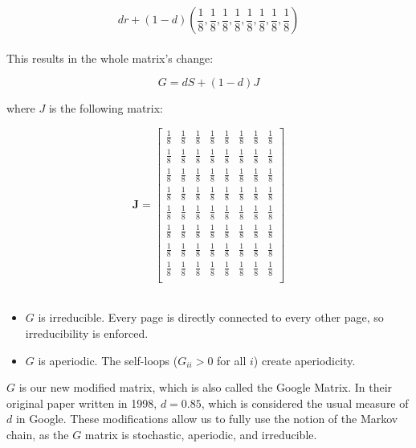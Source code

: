 \documentclass{article}
\begin{document}
\[ dr+(1-d)\left(\frac{1}{8}, \frac{1}{8}, \frac{1}{8}, \frac{1}{8}, \frac{1}{8}, \frac{1}{8}, \frac{1}{8}, \frac{1}{8}\right) \]
\\


This results in the whole matrix's change:

\[ G=dS + (1-d)J\]

where \( J \) is the following matrix:

\[ \mathbf{J} = \begin{bmatrix}
\frac{1}{8} & \frac{1}{8} & \frac{1}{8} & \frac{1}{8} & \frac{1}{8} & \frac{1}{8} & \frac{1}{8} & \frac{1}{8} \\
\frac{1}{8} & \frac{1}{8} & \frac{1}{8} & \frac{1}{8} & \frac{1}{8} & \frac{1}{8} & \frac{1}{8} & \frac{1}{8} \\
\frac{1}{8} & \frac{1}{8} & \frac{1}{8} & \frac{1}{8} & \frac{1}{8} & \frac{1}{8} & \frac{1}{8} & \frac{1}{8} \\
\frac{1}{8} & \frac{1}{8} & \frac{1}{8} & \frac{1}{8} & \frac{1}{8} & \frac{1}{8} & \frac{1}{8} & \frac{1}{8} \\
\frac{1}{8} & \frac{1}{8} & \frac{1}{8} & \frac{1}{8} & \frac{1}{8} & \frac{1}{8} & \frac{1}{8} & \frac{1}{8} \\
\frac{1}{8} & \frac{1}{8} & \frac{1}{8} & \frac{1}{8} & \frac{1}{8} & \frac{1}{8} & \frac{1}{8} & \frac{1}{8} \\
\frac{1}{8} & \frac{1}{8} & \frac{1}{8} & \frac{1}{8} & \frac{1}{8} & \frac{1}{8} & \frac{1}{8} & \frac{1}{8} \\
\frac{1}{8} & \frac{1}{8} & \frac{1}{8} & \frac{1}{8} & \frac{1}{8} & \frac{1}{8} & \frac{1}{8} & \frac{1}{8} \\
\end{bmatrix} \]
\\

\begin{itemize}
    \item \( G \) is irreducible. Every page is directly connected to every other page, so irreducibility is enforced.
    \item \( G \) is aperiodic. The self-loops (\( G_{ii} > 0 \) for all \( i \)) create aperiodicity.
\end{itemize}

\( G \) is our new modified matrix, which is also called the Google Matrix. In their original paper written in 1998, \( d = 0.85 \), which is considered the usual measure of \( d \) in Google. 
These modifications allow us to fully use the notion of the Markov chain, as the \( G \) matrix is stochastic, aperiodic, and irreducible.
\\
\end{document}
